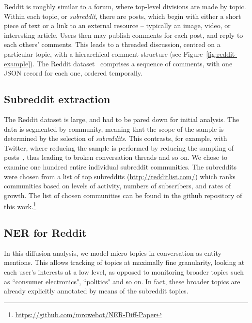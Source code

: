 \documentclass[sigconf]{acmart}
\begin{document}
Reddit is roughly similar to a forum, where top-level divisions are made by topic.
Within each topic, or {\em subreddit}, there are posts, which begin with either a short piece of text or a link to an external resource -- typically an image, video, or interesting article.
Users then may publish comments for each post, and reply to each others' comments.
This leads to a threaded discussion, centred on a particular topic, with a hierarchical comment structure (see Figure~\ref{fig:reddit-example}).
The Reddit dataset~\cite{reddit-data} comprises a sequence of comments, with one JSON record for each one, ordered temporally.


\subsection{Subreddit extraction}

The Reddit dataset is large, and had to be pared down for initial analysis.
The data is segmented by community, meaning that the scope of the sample is determined by the selection of {\em subreddits}.
This contrasts, for example, with Twitter, where reducing the sample is performed by reducing the sampling of posts~\cite{kergl2014endogenesis}, thus leading to broken conversation threads and so on.
We chose to examine one hundred entire individual subreddit communities.
The subreddits were chosen from a list of top subreddits (\url{http://redditlist.com/}) which ranks communities based on levels of activity, numbers of subscribers, and rates of growth.
The list of chosen communities can be found in the github repository of this work.\footnote{\url{https://github.com/mrowebot/NER-Diff-Paper}}


\subsection{NER for Reddit}

In this diffusion analysis, we model micro-topics in conversation as entity mentions.
This allows tracking of topics at maximally fine granularity, looking at each user's interests at a low level, as opposed to monitoring broader topics such as ``consumer electronics", ``politics" and so on.
In fact, these broader topics are already explicitly annotated by means of the subreddit topics.
\end{document}
